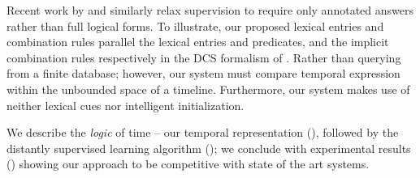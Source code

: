Recent work by  and 
	 similarly relax supervision 
	to require only annotated answers rather than full logical forms.
To illustrate, our proposed lexical entries and combination rules parallel
	the lexical entries and predicates, and the implicit combination rules
	respectively in the DCS formalism of .
Rather than querying from a finite database; however, our system must compare
	temporal expression within the unbounded space of a timeline.
Furthermore, our system makes use of neither lexical cues nor intelligent
	initialization.


We describe the \textit{logic} of time -- our temporal representation
	(), followed by the distantly supervised learning algorithm
	(); we conclude with experimental results 
	() showing our
	approach to be competitive with state of the art systems.
